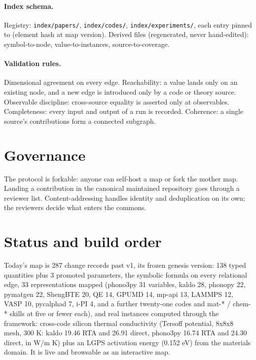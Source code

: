 \documentclass[11pt,a4paper]{article}
\begin{document}
\paragraph{Index schema.} Registry: \texttt{index/papers/}, \texttt{index/codes/},
\texttt{index/experiments/}, each entry pinned to (element hash at map version).
Derived files (regenerated, never hand-edited): symbol-to-node,
value-to-instances, source-to-coverage.

\paragraph{Validation rules.} Dimensional agreement on every edge. Reachability: a value
lands only on an existing node, and a new edge is introduced only by a code or
theory source. Observable discipline: cross-source equality is asserted only at
observables. Completeness: every input and output of a run is recorded.
Coherence: a single source's contributions form a connected subgraph.

\section{Governance}

The protocol is forkable: anyone can self-host a map or fork the mother map.
Landing a contribution in the canonical maintained repository goes through a
reviewer list. Content-addressing handles identity and deduplication on its own;
the reviewers decide what enters the commons.

\section{Status and build order}

Today's map is 287 change records past v1, its frozen genesis version:
138 typed quantities plus 3 promoted
parameters, the symbolic formula on every relational edge, 33 representations
mapped (phono3py 31 variables, kaldo 28, phonopy 22, pymatgen 22, ShengBTE 20,
QE 14, GPUMD 14, mp-api 13, LAMMPS 12, VASP 10, pycalphad 7, i-PI 4, and a further
twenty-one codes and mat-* / chem-* skills at five or fewer each), and real instances
computed through the framework: cross-code silicon thermal conductivity
(Tersoff potential, 8x8x8 mesh, 300 K: kaldo 19.46 RTA and 26.91 direct,
phono3py 16.74 RTA and 24.30 direct, in W/m K) plus an LGPS activation energy
(0.152 eV) from the materials domain. It is live and browsable as an
interactive map.
\end{document}
